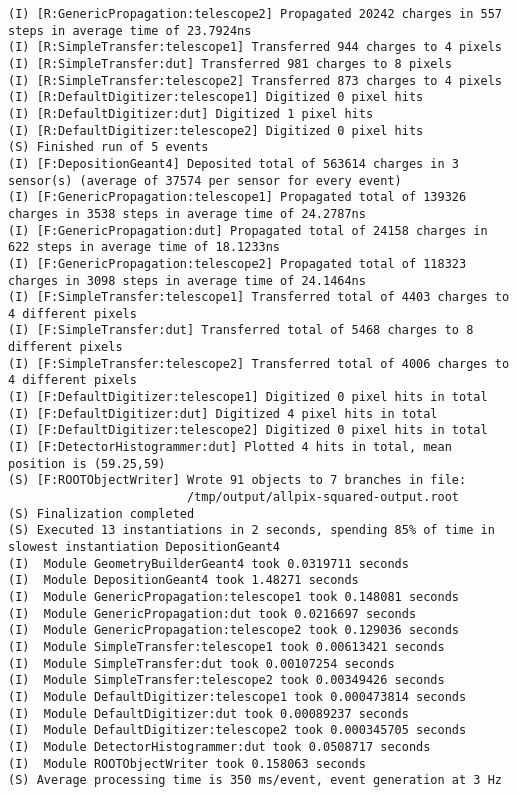 \begin{lstlisting}[breaklines]
(I) [R:GenericPropagation:telescope2] Propagated 20242 charges in 557 steps in average time of 23.7924ns
(I) [R:SimpleTransfer:telescope1] Transferred 944 charges to 4 pixels
(I) [R:SimpleTransfer:dut] Transferred 981 charges to 8 pixels
(I) [R:SimpleTransfer:telescope2] Transferred 873 charges to 4 pixels
(I) [R:DefaultDigitizer:telescope1] Digitized 0 pixel hits
(I) [R:DefaultDigitizer:dut] Digitized 1 pixel hits
(I) [R:DefaultDigitizer:telescope2] Digitized 0 pixel hits
(S) Finished run of 5 events
(I) [F:DepositionGeant4] Deposited total of 563614 charges in 3 sensor(s) (average of 37574 per sensor for every event)
(I) [F:GenericPropagation:telescope1] Propagated total of 139326 charges in 3538 steps in average time of 24.2787ns
(I) [F:GenericPropagation:dut] Propagated total of 24158 charges in 622 steps in average time of 18.1233ns
(I) [F:GenericPropagation:telescope2] Propagated total of 118323 charges in 3098 steps in average time of 24.1464ns
(I) [F:SimpleTransfer:telescope1] Transferred total of 4403 charges to 4 different pixels
(I) [F:SimpleTransfer:dut] Transferred total of 5468 charges to 8 different pixels
(I) [F:SimpleTransfer:telescope2] Transferred total of 4006 charges to 4 different pixels
(I) [F:DefaultDigitizer:telescope1] Digitized 0 pixel hits in total
(I) [F:DefaultDigitizer:dut] Digitized 4 pixel hits in total
(I) [F:DefaultDigitizer:telescope2] Digitized 0 pixel hits in total
(I) [F:DetectorHistogrammer:dut] Plotted 4 hits in total, mean position is (59.25,59)
(S) [F:ROOTObjectWriter] Wrote 91 objects to 7 branches in file:
                         /tmp/output/allpix-squared-output.root
(S) Finalization completed
(S) Executed 13 instantiations in 2 seconds, spending 85% of time in slowest instantiation DepositionGeant4
(I)  Module GeometryBuilderGeant4 took 0.0319711 seconds
(I)  Module DepositionGeant4 took 1.48271 seconds
(I)  Module GenericPropagation:telescope1 took 0.148081 seconds
(I)  Module GenericPropagation:dut took 0.0216697 seconds
(I)  Module GenericPropagation:telescope2 took 0.129036 seconds
(I)  Module SimpleTransfer:telescope1 took 0.00613421 seconds
(I)  Module SimpleTransfer:dut took 0.00107254 seconds
(I)  Module SimpleTransfer:telescope2 took 0.00349426 seconds
(I)  Module DefaultDigitizer:telescope1 took 0.000473814 seconds
(I)  Module DefaultDigitizer:dut took 0.00089237 seconds
(I)  Module DefaultDigitizer:telescope2 took 0.000345705 seconds
(I)  Module DetectorHistogrammer:dut took 0.0508717 seconds
(I)  Module ROOTObjectWriter took 0.158063 seconds
(S) Average processing time is 350 ms/event, event generation at 3 Hz
\end{lstlisting}
